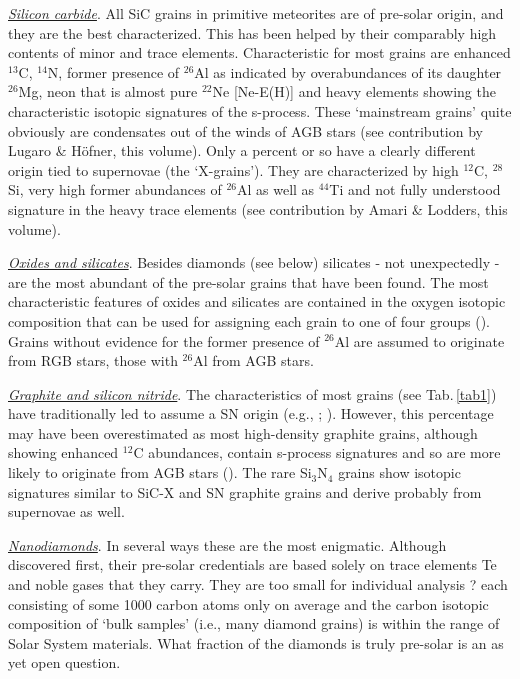 \documentclass{iau}
\begin{document}
{\underline{\it Silicon carbide}}. All SiC grains in primitive meteorites are of pre-solar origin, and they are
the best characterized. This has been helped by their comparably high contents of minor and
trace elements. Characteristic for most grains are enhanced $^{13}$C, $^{14}$N, former presence of $^{26}$Al
as indicated by overabundances of its daughter $^{26}$Mg, neon that is almost pure $^{22}$Ne 
[Ne-E(H)]
and heavy elements showing the characteristic isotopic signatures of the s-process. These
`mainstream grains' quite obviously are condensates out of the winds of AGB stars (see
contribution by Lugaro \& H{\"o}fner, this volume). Only a percent or so have a clearly different origin tied to
supernovae (the `X-grains'). They are characterized by high $^{12}$C, $^{28}$Si, very high former
abundances of $^{26}$Al as well as $^{44}$Ti and not fully understood signature in the heavy trace
elements (see contribution by Amari \& Lodders, this volume).

{\underline{\it Oxides and silicates}}. Besides diamonds (see below) silicates - not unexpectedly - are the
most abundant of the pre-solar grains that have been found. The most characteristic features
of oxides and silicates are contained in the oxygen isotopic composition that can be used for
assigning each grain to one of four groups 
(\cite[Nittler et al. 1997]{Nittler_etal97}). Grains without evidence for
the former presence of $^{26}$Al are assumed to originate from RGB stars, those with $^{26}$Al from AGB stars.

{\underline{\it Graphite and silicon nitride}}. The characteristics of most grains (see Tab.\,\ref{tab1}) have
traditionally led to assume a SN origin (e.g., 
\cite[Zinner 1998]{Zinner98}; 
\cite[Hoppe \& Zinner 2000]{HoppeZinner00}). 
However,
this percentage may have been overestimated as most high-density graphite grains, although
showing enhanced $^{12}$C abundances, contain s-process signatures and so are more likely to
originate from AGB stars 
(\cite[Croat et al.  2005]{Croat_etal05}). The rare Si$_3$N$_4$ grains show isotopic signatures
similar to SiC-X and SN graphite grains and derive probably from supernovae as well.

{\underline{\it Nanodiamonds}}. In several ways these are the most enigmatic. Although discovered first,
their pre-solar credentials are based solely on trace elements Te and noble gases that they
carry. They are too small for individual analysis ? each consisting of some 1000 carbon atoms
only on average and the carbon isotopic composition of `bulk samples' (i.e., many diamond
grains) is within the range of Solar System materials. What fraction of the diamonds is truly
pre-solar is an as yet open question.
\end{document}
